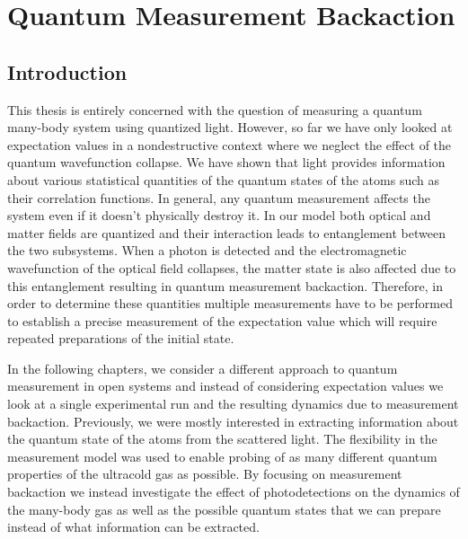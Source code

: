 
\chapter{Quantum Measurement Backaction}  

\ifpdf
    \graphicspath{{Chapter4/Figs/Raster/}{Chapter4/Figs/PDF/}{Chapter4/Figs/}}
\else
    \graphicspath{{Chapter4/Figs/Vector/}{Chapter4/Figs/}}
\fi



\section{Introduction}

This thesis is entirely concerned with the question of measuring a
quantum many-body system using quantized light. However, so far we
have only looked at expectation values in a nondestructive context
where we neglect the effect of the quantum wavefunction collapse. We
have shown that light provides information about various statistical
quantities of the quantum states of the atoms such as their
correlation functions. In general, any quantum measurement affects the
system even if it doesn't physically destroy it. In our model both
optical and matter fields are quantized and their interaction leads to
entanglement between the two subsystems. When a photon is detected and
the electromagnetic wavefunction of the optical field collapses, the
matter state is also affected due to this entanglement resulting in
quantum measurement backaction. Therefore, in order to determine these
quantities multiple measurements have to be performed to establish a
precise measurement of the expectation value which will require
repeated preparations of the initial state.

In the following chapters, we consider a different approach to quantum
measurement in open systems and instead of considering expectation
values we look at a single experimental run and the resulting dynamics
due to measurement backaction. Previously, we were mostly interested
in extracting information about the quantum state of the atoms from
the scattered light. The flexibility in the measurement model was used
to enable probing of as many different quantum properties of the
ultracold gas as possible. By focusing on measurement backaction we
instead investigate the effect of photodetections on the dynamics of
the many-body gas as well as the possible quantum states that we can
prepare instead of what information can be extracted.


